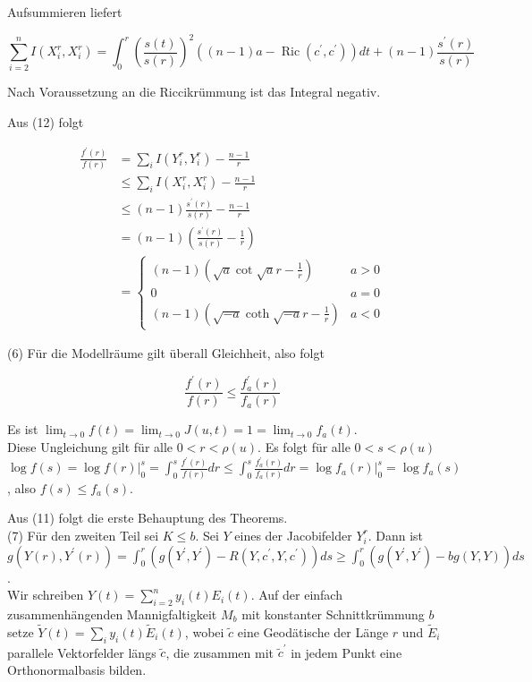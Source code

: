 \documentclass[10pt]{article}
\begin{document}
Aufsummieren liefert

$$
\sum_{i=2}^{n} I\left(X_{i}^{r}, X_{i}^{r}\right)=\int_{0}^{r}\left(\frac{s(t)}{s(r)}\right)^{2}\left((n-1) a-\operatorname{Ric}\left(c^{\prime}, c^{\prime}\right)\right) d t+(n-1) \frac{s^{\prime}(r)}{s(r)}
$$

Nach Voraussetzung an die Riccikrümmung ist das Integral negativ.

Aus (12) folgt

$$
\begin{aligned}
\frac{f^{\prime}(r)}{f(r)} & =\sum_{i} I\left(Y_{i}^{r}, Y_{i}^{r}\right)-\frac{n-1}{r} \\
& \leq \sum_{i} I\left(X_{i}^{r}, X_{i}^{r}\right)-\frac{n-1}{r} \\
& \leq(n-1) \frac{s^{\prime}(r)}{s(r)}-\frac{n-1}{r} \\
& =(n-1)\left(\frac{s^{\prime}(r)}{s(r)}-\frac{1}{r}\right) \\
& = \begin{cases}(n-1)\left(\sqrt{a} \cot \sqrt{a} r-\frac{1}{r}\right) & a>0 \\
0 & a=0 \\
(n-1)\left(\sqrt{-a} \operatorname{coth} \sqrt{-a} r-\frac{1}{r}\right) & a<0\end{cases}
\end{aligned}
$$

(6) Für die Modellräume gilt überall Gleichheit, also folgt

$$
\frac{f^{\prime}(r)}{f(r)} \leq \frac{f_{a}^{\prime}(r)}{f_{a}(r)}
$$

Es ist $\lim _{t \rightarrow 0} f(t)=\lim _{t \rightarrow 0} J(u, t)=1=\lim _{t \rightarrow 0} f_{a}(t)$.\\
Diese Ungleichung gilt für alle $0<r<\rho(u)$. Es folgt für alle $0<s<\rho(u)$\\
$\log f(s)=\left.\log f(r)\right|_{0} ^{s}=\int_{0}^{s} \frac{f^{\prime}(r)}{f(r)} d r \leq \int_{0}^{s} \frac{f_{a}^{\prime}(r)}{f_{a}(r)} d r=\left.\log f_{a}(r)\right|_{0} ^{s}=\log f_{a}(s)$, also $f(s) \leq f_{a}(s)$.

Aus (11) folgt die erste Behauptung des Theorems.\\
(7) Für den zweiten Teil sei $K \leq b$. Sei $Y$ eines der Jacobifelder $Y_{i}^{r}$. Dann ist\\
$g\left(Y(r), Y^{\prime}(r)\right)=\int_{0}^{r}\left(g\left(Y^{\prime}, Y^{\prime}\right)-R\left(Y, c^{\prime}, Y, c^{\prime}\right)\right) d s \geq \int_{0}^{r}\left(g\left(Y^{\prime}, Y^{\prime}\right)-b g(Y, Y)\right) d s$.\\
Wir schreiben $Y(t)=\sum_{i=2}^{n} y_{i}(t) E_{i}(t)$. Auf der einfach zusammenhängenden Mannigfaltigkeit $M_{b}$ mit konstanter Schnittkrümmung $b$ setze $\tilde{Y}(t)=\sum_{i} y_{i}(t) \tilde{E}_{i}(t)$, wobei $\tilde{c}$ eine Geodätische der Länge $r$ und $\tilde{E}_{i}$ parallele Vektorfelder längs $\tilde{c}$, die zusammen mit $\tilde{c}^{\prime}$ in jedem Punkt eine Orthonormalbasis bilden.
\end{document}
